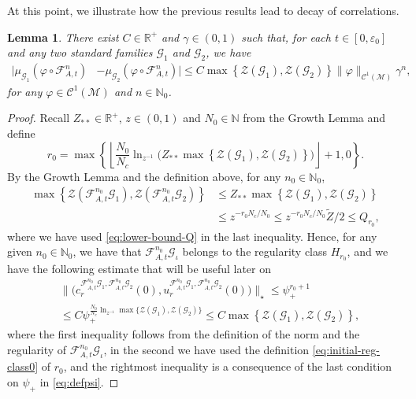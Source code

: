 \documentclass{amsart}
\numberwithin{equation}{section}
\newtheorem{lemma}[theorem]{Lemma}
\newcommand\ve{\varepsilon}
\newcommand\vf{\varphi}
\renewcommand{\le}{\leqslant}
\newcommand\cC{{\mathcal C}}
\newcommand\cF{{\mathcal F}}
\newcommand\cG{{\mathcal G}}
\newcommand\cM{{\mathcal M}}
\newcommand\cZ{{\mathcal Z}}
\newcommand\bN{{\mathbb N}}
\newcommand\bR{{\mathbb R}}
\newcommand{\catt}{\cF_{A,t}}
\begin{document}
At this point, we illustrate how the previous results lead to decay of correlations.

\begin{lemma}\label{lem:decay-pre-standard}
  There exist \(C \in \bR^+\) and \(\gamma \in (0,1)\) such that, for each \(t \in [0, \ve_0]\) and any two standard families \(\cG_1\) and \(\cG_2\), we have
  \[
\begin{split}
      \bigl|\mu_{\cG_1}\left(\vf \circ \catt^n\right) &- \mu_{\cG_2}\left(\vf \circ \catt^n\right)\bigr| \le C  \max\left\{\cZ(\cG_1), \cZ(\cG_2) \right\} \|\vf\|_{\cC^1(\cM)}\gamma^n,
\end{split}
  \]
for any \(\vf \in \cC^1(\cM)\) and \(n \in \bN_0\).
\end{lemma}
\begin{proof}
Recall \(Z_{**}\in \bR^+\), \(z \in (0,1)\) and \(N_0 \in \bN\) from the Growth Lemma and define
\begin{equation}\label{eq:initial-reg-class0}
  r_0 = \max\left\{\left\lfloor\frac{N_0}{N_c} \ln_{z^{-1}}\biggr(Z_{**}\max\left\{\cZ(\cG_1), \cZ(\cG_2)\right\}\biggl)\right\rfloor + 1, 0\right\}.
\end{equation}
By the Growth Lemma and the definition above, for any \(n_0 \in \bN_0\),
\[
\begin{split}
   \max\left\{\cZ(\catt^{n_0}\cG_1), \cZ(\catt^{n_0}\cG_2)\right\} &\le Z_{**}\max\left\{\cZ(\cG_1), \cZ(\cG_2)\right\}\\
   &\le  z^{-r_0 N_c / N_0} \le z^{-r_0 N_c / N_0} \widetilde Z/2 \le Q_{r_0},
\end{split}
\]
where we have used \eqref{eq:lower-bound-Q} in the last inequality. Hence, for any given \(n_0 \in \bN_0\), we have that \(\catt^{n_0}\cG_{\iota}\) belongs to the regularity class \(H_{r_0}\), and we have the following estimate that will be useful later on
\begin{equation}\label{eq:initial-norm}
\begin{split}
&\biggl\|\bigl(c^{\catt^{n_0} \cG_1, \catt^{n_0} \cG_2}_r (0), u^{\catt^{n_0} \cG_1, \catt^{n_0} \cG_2}_r (0)\bigr) \biggr\|_{\star} \le  \psi_{+}^{r_0+1} \\
&\le C \psi_{+}^{\frac{N_0}{N_c}\ln_{z^{-1}} \max\{\cZ(\cG_1), \cZ(\cG_2)\}}  \le C\max\left\{\cZ(\cG_1), \cZ(\cG_2) \right\},
\end{split}
\end{equation}
where the first inequality follows from the definition of the norm and the regularity of \(\catt^{n_0} \cG_{\iota}\), in the second we have used the definition \eqref{eq:initial-reg-class0} of \(r_0\), and the rightmost inequality is a consequence of the last condition on \(\psi_{+}\) in \eqref{eq:defpsi}. 


\end{proof}
\end{document}
